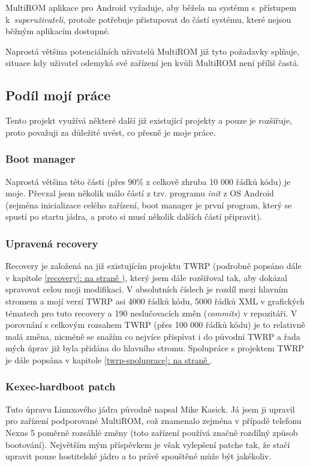 \documentclass[12pt, a4paper, oneside]{article}
\newcommand{\It}{\textit}  %
\newcommand*{\fullref}[1]{\hyperref[{#1}]{\ref*{#1}: \uv{\nameref*{#1}} na straně \pageref{#1}}}
\begin{document}
MultiROM aplikace pro Android vyžaduje, aby běžela na systému s~přístupem k~\It{superuživateli}, protože potřebuje přistupovat do částí systému, které nejsou běžným aplikacím dostupné.

Naprostá většina potenciálních uživatelů MultiROM již tyto požadavky splňuje, situace kdy uživatel odemyká své zařízení jen kvůli MultiROM není příliš častá.

\subsection{Podíl mojí práce}
Tento projekt využívá některé další již existující projekty a pouze je rozšiřuje, proto považuji za důležité uvést, co přesně je moje práce.

\subsubsection{Boot manager}
Naprostá většina této části (přes 90\% z celkově zhruba 10 000 řádků kódu) je moje. Převzal jsem několik málo částí z tzv. programu \It{init} z OS Android (zejména inicializace celého zařízení, boot manager je první program, který se spustí po startu jádra, a proto si musí několik dalších částí připravit).

\subsubsection{Upravená recovery}
Recovery je založená na již existujícím projektu TWRP (podrobně popsáno dále v kapitole \fullref{recovery}), který jsem dále rozšiřoval tak, aby dokázal spravovat celou moji modifikaci. V absolutních číslech je rozdíl mezi hlavním stromem a mojí verzí TWRP asi 4000 řádků kódu, 5000 řádků XML v grafických tématech pro tuto recovery a 190 neslučovacích změn (\It{commits}) v repozitáři. V porovnání s celkovým rozsahem TWRP (přes 100 000 řádků kódu) je to relativně malá změna, nicméně se snažím co nejvíce přispívat i do původní TWRP a řada mých úprav již byla přidána do hlavního stromu. Spolupráce s projektem TWRP je dále popsána v kapitole \fullref{twrp-spoluprace}.

\subsubsection{Kexec-hardboot patch}
Tuto úpravu Linuxového jádra původně napsal Mike Kasick\cite{kexec-hardboot-orig}. Já jsem ji upravil pro zařízení podporované MultiROM, což znamenalo zejména v případě telefonu Nexus 5 poměrně rozsáhlé změny (toto zařízení používá značně rozdílný způsob bootování). Největším mým příspěvkem je však vylepšení patche tak, že stačí upravit pouze hostitelské jádro a to právě spouštěné může být jakékoliv.
\end{document}
